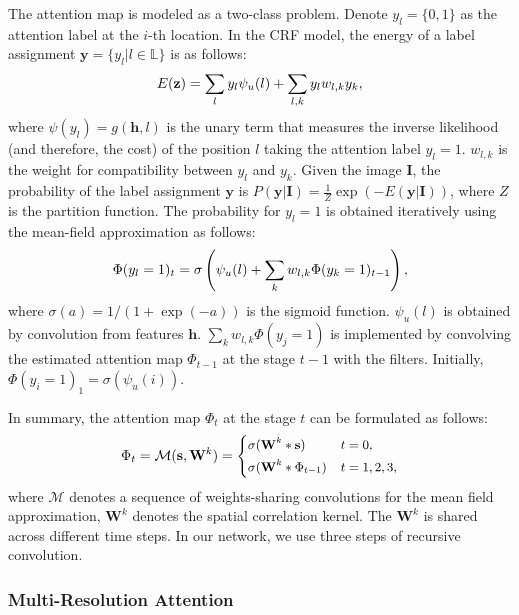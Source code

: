 \documentclass[10pt,twocolumn,letterpaper]{article}
\begin{document}
The attention map is modeled as a two-class problem. Denote $y_l=\{0, 1\}$ as the attention label at the $i$-th location. In the CRF model, the energy of a label assignment $\mathbf{y}=\{y_l|l\in \mathbb{L}\}$ is as follows:
\begin{equation}\footnotesize
E(\mathbf{z}) =  \sum_l y_l \psi_u(l) + \sum_{l,k} y_{l} w_{l,k} y_k,
\end{equation}
where $\psi(y_l) = g(\mathbf{h}, l)$ is the unary term that measures the inverse likelihood (and therefore, the cost) of the position
$l$ taking the attention label $y_l=1$. $w_{l,k}$ is the weight for compatibility between $y_l$ and $y_k$. Given the image $\mathbf{I}$, the probability of the label assignment $\mathbf{y}$  is  $P(\mathbf{y}|\mathbf{I}) = \frac{1}{Z}\exp(-E(\mathbf{y}|\mathbf{I}))$, where $Z$ is the partition function. 
The probability for $y_l=1$ is obtained iteratively using the mean-field approximation as follows:
\begin{equation}\small
  \Phi(y_l=1)_t = \sigma \left(  \psi_u(l) + \sum_{k} w_{l,k} \Phi(y_k=1)_{t-1} \right),
\end{equation}
where $\sigma(a) = 1/(1+\exp(-a))$ is the sigmoid function. 
$\psi_u(l)$ is obtained by convolution from features $\mathbf{h}$. $\sum_{k} w_{l,k} \Phi(y_j=1)$ is implemented by convolving the estimated attention map  $\Phi_{t-1}$ at the stage $t-1$ with the filters.  Initially, $\Phi(y_i=1)_1 =\sigma ( \psi_u(i))$.

In summary, the attention map $\Phi_t$ at the stage $t$ can be formulated as follows:
\begin{equation}\small
   \Phi_{t}= \mathcal{M}(\mathbf{s}, \mathbf{W}^{k}) = \left\{
   \begin{aligned}
      & \sigma (\mathbf{W}^{k} * \mathbf{s}) & t &= 0, \\
      & \sigma (\mathbf{W}^{k} * \Phi_{t-1}) & t & = 1,2,3,
   \end{aligned}
    \right.
    \label{eq:AttCNN}
\end{equation}
where $\mathcal{M}$ denotes a sequence of weights-sharing convolutions for the mean field approximation, 
$\mathbf{W}^k$ denotes the spatial correlation kernel. 
The $\mathbf{W}^k$ is shared across different time steps.
In our network, we use three steps of recursive convolution.



\vspace{-1em}
\subsubsection{Multi-Resolution Attention}
\label{Sec:Context}
\end{document}
